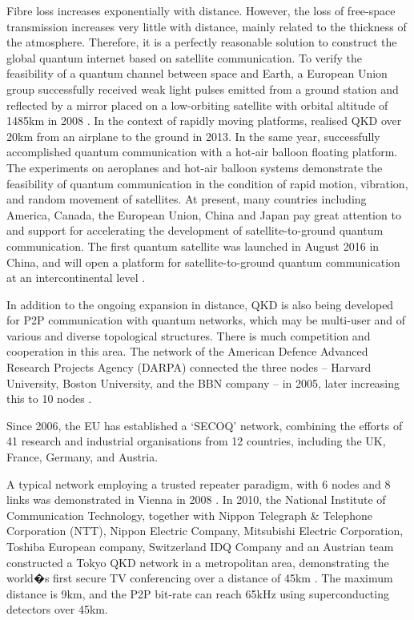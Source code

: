 \documentclass[aps, rmp, twocolumn, amsmath, amssymb, nofootinbib, superscriptaddress, longbibliography, floatfix, table-of-contents, eqsecnum]{revtex4-1}
\newcommand{\comment}[1]{{\color{blue}{\textbf{#1}}}}
\begin{document}
Fibre loss increases exponentially with distance. However, the loss of free-space transmission increases very little with distance,  mainly related to the thickness of the atmosphere. Therefore, it is a perfectly reasonable solution to construct the global quantum internet based on satellite communication. To verify the feasibility of a quantum channel between space and Earth, a European Union group successfully received weak light pulses emitted from a ground station and reflected by a mirror placed on a low-orbiting satellite with orbital altitude of 1485km in 2008 \cite{bib:NJP_10_033038}. In the context of rapidly moving platforms, \cite{bib:NP_7_382} realised QKD over 20km from an airplane to the ground in 2013. In the same year, \cite{bib:NP_7_387} successfully accomplished quantum communication with a hot-air balloon floating platform. The experiments on aeroplanes and hot-air balloon systems demonstrate the feasibility of quantum communication in the condition of rapid motion, vibration, and random movement of satellites. At present, many countries including America, Canada, the European Union, China and Japan pay great attention to and support for accelerating the development of satellite-to-ground quantum communication. The first quantum satellite was launched in August 2016 in China, and will open a platform for satellite-to-ground quantum communication at an intercontinental level \cite{bib:N_535_478}.

In addition to the ongoing expansion in distance, QKD is also being developed for P2P communication with quantum networks, which may be multi-user and of various and diverse topological structures. There is much competition and cooperation in this area. The network of the American Defence Advanced Research Projects Agency (DARPA) connected the three nodes -- Harvard University, Boston University, and the BBN company -- in 2005, later increasing this to 10 nodes \cite{bib:QCC_2006_83}.

Since 2006, the EU has established a `SECOQ' network, combining the efforts of 41 research and industrial organisations from 12 countries, including the UK, France, Germany, and Austria.

A typical network employing a trusted repeater paradigm, with 6 nodes and 8 links was demonstrated in Vienna in 2008 \cite{bib:NJP_11_075001}. In 2010, the National Institute of Communication Technology, together with Nippon Telegraph \& Telephone Corporation (NTT), Nippon Electric Company, Mitsubishi Electric Corporation, Toshiba European company, Switzerland IDQ Company and an Austrian team constructed a Tokyo QKD network in a metropolitan area, demonstrating the world�s first secure TV conferencing over a distance of 45km \cite{bib:OExp_19_10387}. The maximum distance is 9km, and the P2P bit-rate can reach 65kHz using superconducting detectors over 45km. \comment{How is the max distance both 45km and 9km???}
\end{document}
